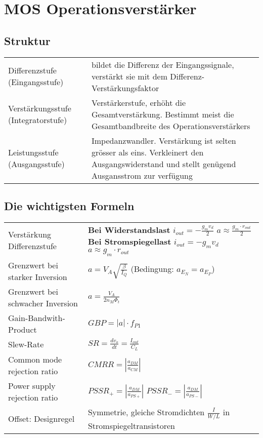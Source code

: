 \section{MOS Operationsverstärker}

\subsection{Struktur}
\begin{tabular}{p{3cm}p{15cm}}
	Differenzstufe (Eingangsstufe) & bildet die Differenz der Eingangssignale,
	verstärkt sie mit dem Differenz-Verstärkungsfaktor\\
	Verstärkungsstufe	(Integratorstufe) & Verstärkerstufe, erhöht die
	Gesamtverstärkung. Bestimmt meist die Gesamtbandbreite des
	Operationsverstärkers\\
	Leistungsstufe (Ausgangsstufe) & Impedanzwandler. Verstärkung ist selten
	grösser als eins. Verkleinert den Ausgangswiderstand und stellt genügend
	Ausgansstrom zur verfügung\\
\end{tabular}

\subsection{Die wichtigsten Formeln}
\begin{tabular}{p{7cm}p{11cm}}
Verstärkung Differenzstufe &
\textbf{Bei Widerstandslast} $i_{out}=-\frac{g_mv_d}{2}$
$a\approx\frac{g_m\cdot r_{out}}{2}$ \newline
\textbf{Bei Stromspiegellast} $i_{out}=-g_mv_d$ $a\approx g_m\cdot r_{out}$
\\
Grenzwert bei starker Inversion & $a=V_A\sqrt{\frac{\beta}{I_Q}}$ (Bedingung:
$a_{E_N}=a_{E_P}$)\\
Grenzwert bei schwacher Inversion & $a=\frac{V_A}{2n_M\Phi_t}$\\
Gain-Bandwith-Product & $GBP=|a|\cdot f_{P1}$ \\
Slew-Rate & $SR=\frac{dv_o}{dt}=\frac{I_{out}}{C_L}$ \\
Common mode rejection ratio & $CMRR=\left| \frac{a_{DM}}{a_{CM}}\right|$\\
Power supply rejection ratio &
$PSSR_+ = \left| \frac{a_{DM}}{a_{PS+}}\right|$ \newline
$PSSR_- = \left| \frac{a_{DM}}{a_{PS-}}\right|$ \\
Offset: Designregel & Symmetrie, gleiche Stromdichten $\frac{I}{W/L}$ in
Stromspiegeltransistoren\\
\end{tabular}
